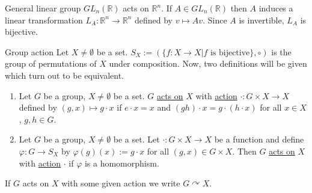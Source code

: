 \documentclass[12pt]{article}
\newcommand{\R}{\mathbb{R}}
\begin{document}
	\begin{myex}{General linear group}{}
		$GL_n(\R)$ acts on $\R^n$. If $A\in GL_n(\R)$ then $A$ induces a linear transformation $L_A:\R^n\to\R^n$ defined by $v\mapsto Av$. Since $A$ is invertible, $L_A$ is bijective.
	\end{myex}
	
	\begin{mydef}{Group action}{}
		Let $X\neq\emptyset$ be a set. $S_X:=(\{f:X\to X|f\text{ is bijective}\}, \circ)$ is the group of permutations of $X$ under composition. Now, two definitions will be given which turn out to be equivalent.
		\begin{enumerate}
			\item Let $G$ be a group, $X\neq\emptyset$ be a set. $G$ \underline{acts on} $X$ with \underline{action} $\cdot:G\times X\to X$ defined by $(g, x)\mapsto g\cdot x$ if $e\cdot x=x$ and $(gh)\cdot x=g\cdot(h\cdot x)$ for all $x\in X$, $g, h\in G$.
			
			\item Let $G$ be a group, $X\neq\emptyset$ be a set. Let $\cdot:G\times X\to X$ be a function and define $\varphi:G\to S_X$ by $\varphi(g)(x):=g\cdot x$ for all $(g, x)\in G\times X$. Then $G$ \underline{acts on} $X$ with \underline{action} $\cdot$ if $\varphi$ is a homomorphism.
		\end{enumerate}
		If $G$ acts on $X$ with some given action we write $G\curvearrowright X$.
	\end{mydef}
	
\end{document}
